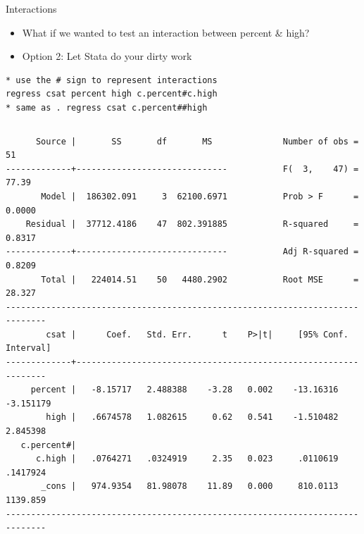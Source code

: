 \documentclass[table,smaller]{beamer}
\begin{document}
\begin{frame}[fragile,label=sec-4-2]{Interactions}
 \begin{itemize}
\item What if we wanted to test an interaction between percent \& high?
\item Option 2: Let Stata do your dirty work
\end{itemize}


\begin{verbatim}
* use the # sign to represent interactions 
regress csat percent high c.percent#c.high
* same as . regress csat c.percent##high
\end{verbatim}


\vspace{-.5em}
\begin{columns}
\begin{block}{}
\begin{verbatim}
      Source |       SS       df       MS              Number of obs =      51
-------------+------------------------------           F(  3,    47) =   77.39
       Model |  186302.091     3  62100.6971           Prob > F      =  0.0000
    Residual |  37712.4186    47  802.391885           R-squared     =  0.8317
-------------+------------------------------           Adj R-squared =  0.8209
       Total |   224014.51    50   4480.2902           Root MSE      =  28.327
------------------------------------------------------------------------------
        csat |      Coef.   Std. Err.      t    P>|t|     [95% Conf. Interval]
-------------+----------------------------------------------------------------
     percent |   -8.15717   2.488388    -3.28   0.002    -13.16316   -3.151179
        high |   .6674578   1.082615     0.62   0.541    -1.510482    2.845398
   c.percent#|
      c.high |   .0764271   .0324919     2.35   0.023     .0110619    .1417924
       _cons |   974.9354   81.98078    11.89   0.000     810.0113    1139.859
------------------------------------------------------------------------------
\end{verbatim}
\end{block}
\end{columns}
\vspace{.5em}
\end{frame}
\end{document}
